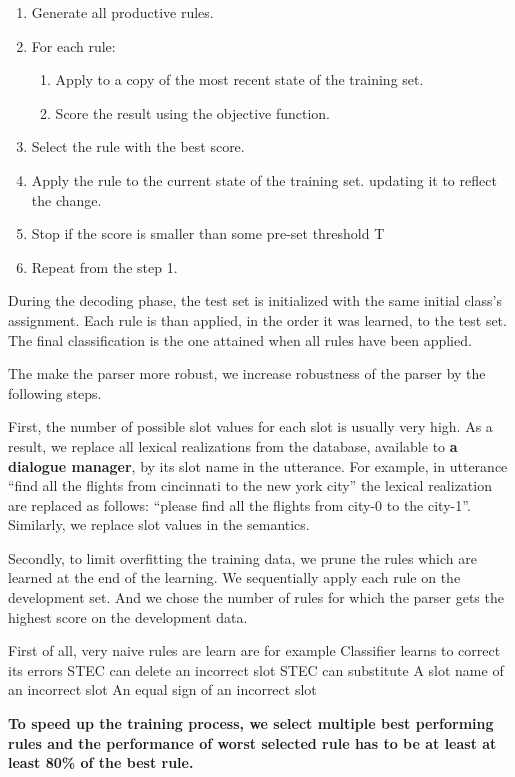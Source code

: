 \documentclass[11pt]{article}
\begin{document}
\begin{enumerate}
  \item Generate all productive rules.
  \item For each rule:
  \begin{enumerate}
    \item Apply to a copy of the most recent state of the training set.
    \item Score the result using the objective function.
  \end{enumerate}
  \item Select the rule with the best score.
  \item Apply the rule  to the current state of the training set. updating it to reflect the change.
  \item Stop if the score is smaller than some pre-set threshold T
  \item Repeat from the step 1.
\end{enumerate}

During the decoding phase, the test set is initialized with the same initial class's assignment. Each rule is than applied, in the order it was learned, to the test set. The final classification is the one attained when all rules have been applied.

The make the parser more robust, we increase robustness of the parser by the following steps. 

First, the number of possible slot values for each slot is usually very high. As a result, we replace all lexical realizations from the database, available to \textbf{a dialogue manager}, by its slot name in the utterance. For example, in utterance ``find all the flights from cincinnati to the new york city'' the lexical realization are replaced as follows: ``please find all the flights from city-0 to the city-1''. Similarly, we replace slot values in the semantics.

Secondly, to limit overfitting the training data, we prune the rules which are learned at the end of the learning. We sequentially apply each rule on the development set. And we chose the number of rules for which the parser gets the highest score on the development data.


First of all, very naive rules are learn are for example 
Classifier learns to correct its errors
STEC can delete an incorrect slot
STEC can substitute
A slot name of an incorrect slot
An equal sign of an incorrect slot

\textbf{To speed up the training process, we select multiple best performing rules and the performance of worst selected rule has to be at least at least 80\% of the best rule.}
\end{document}
